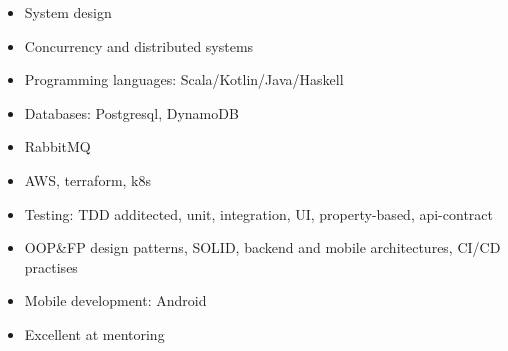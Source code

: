  \begin{multicols}{2}
    \begin{itemize}
      \item System design
      \item Concurrency and distributed systems 
	    \item Programming languages: Scala/Kotlin/Java/Haskell
        \item Databases: Postgresql, DynamoDB
          \item  RabbitMQ
        \item AWS, terraform, k8s 
	    \item Testing: TDD additected, unit, integration, UI, property-based, api-contract 
	    \item OOP\&FP design patterns, SOLID, backend and mobile architectures,
	    CI/CD practises 
        \item Mobile development: Android 
	    \item Excellent at mentoring 
    \end{itemize}
 \end{multicols}
